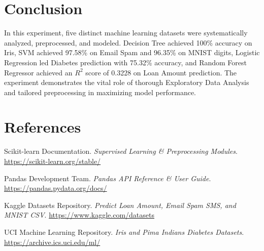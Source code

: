 \documentclass[12pt,a4paper]{article}
\begin{document}
\section{Conclusion}
In this experiment, five distinct machine learning datasets were systematically analyzed, preprocessed, and modeled. Decision Tree achieved 100\% accuracy on Iris, SVM achieved 97.58\% on Email Spam and 96.35\% on MNIST digits, Logistic Regression led Diabetes prediction with 75.32\% accuracy, and Random Forest Regressor achieved an $R^2$ score of 0.3228 on Loan Amount prediction. The experiment demonstrates the vital role of thorough Exploratory Data Analysis and tailored preprocessing in maximizing model performance.

\section{References}
\begin{enumerate}[label={[\arabic*]}]
    \item Scikit-learn Documentation. \textit{Supervised Learning & Preprocessing Modules}. \url{https://scikit-learn.org/stable/}
    \item Pandas Development Team. \textit{Pandas API Reference & User Guide}. \url{https://pandas.pydata.org/docs/}
    \item Kaggle Datasets Repository. \textit{Predict Loan Amount, Email Spam SMS, and MNIST CSV}. \url{https://www.kaggle.com/datasets}
    \item UCI Machine Learning Repository. \textit{Iris and Pima Indians Diabetes Datasets}. \url{https://archive.ics.uci.edu/ml/}
\end{enumerate}
\end{document}
